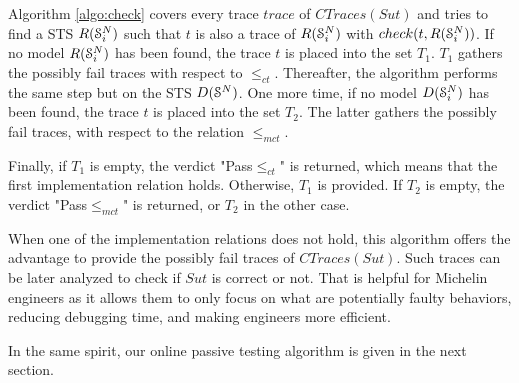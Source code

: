 Algorithm \ref{algo:check} covers every trace $trace$ of
$CTraces({Sut})$ and tries to find a STS $R(\EuScript{S}_i^{N})$
such that $t$ is also a trace of $R(\EuScript{S}_i^{N})$ with
$check(t, R(\EuScript{S}_i^{N}))$.  If no model
$R(\EuScript{S}_i^{N})$ has been found, the trace $t$ is placed
into the set $T_1$. $T_1$ gathers the possibly fail traces
with respect to $\leq_{ct}$. Thereafter, the algorithm performs the same
step but on the STS $D(\EuScript{S}^{N})$. One more time, if no
model $D(\EuScript{S}_i^{N})$ has been found, the trace $t$ is placed
into the set $T_2$.  The latter gathers the possibly fail traces,
with respect to the relation $\leq_{mct}$.

Finally, if $T_1$ is empty, the verdict "Pass$\leq_{ct}$" is
returned, which means that the first implementation relation holds.
Otherwise, $T_1$ is provided. If $T_2$ is empty, the verdict
"Pass$\leq_{mct}$" is returned, or $T_2$ in the other case.

When one of the implementation relations does not hold, this
algorithm offers the advantage to provide the possibly fail
traces of $CTraces({Sut})$. Such traces can be later analyzed to
check if $\mathit{Sut}$ is correct or not. That is helpful for
Michelin engineers as it allows them to only focus on what are
potentially faulty behaviors, reducing debugging time, and
making engineers more efficient.

In the same spirit, our online passive testing algorithm is given
in the next section.
